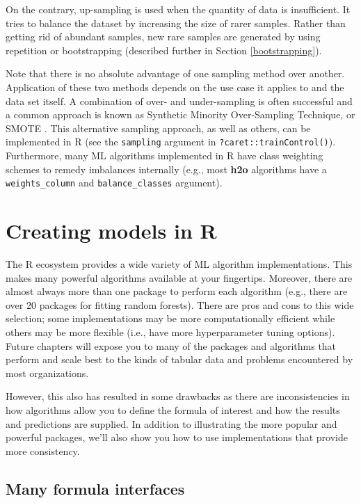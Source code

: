 \documentclass[]{krantz}
\begin{document}
On the contrary, up-sampling is used when the quantity of data is insufficient. It tries to balance the dataset by increasing the size of rarer samples. Rather than getting rid of abundant samples, new rare samples are generated by using repetition or bootstrapping (described further in Section \ref{bootstrapping}).

Note that there is no absolute advantage of one sampling method over another. Application of these two methods depends on the use case it applies to and the data set itself. A combination of over- and under-sampling is often successful and a common approach is known as Synthetic Minority Over-Sampling Technique, or SMOTE \citep{chawla2002smote}. This alternative sampling approach, as well as others, can be implemented in R (see the \texttt{sampling} argument in \texttt{?caret::trainControl()}). Furthermore, many ML algorithms implemented in R have class weighting schemes to remedy imbalances internally (e.g., most \textbf{h2o} algorithms have a \texttt{weights\_column} and \texttt{balance\_classes} argument).

\hypertarget{creating-models-in-r}{%
\section{Creating models in R}\label{creating-models-in-r}}

The R ecosystem provides a wide variety of ML algorithm implementations. This makes many powerful algorithms available at your fingertips. Moreover, there are almost always more than one package to perform each algorithm (e.g., there are over 20 packages for fitting random forests). There are pros and cons to this wide selection; some implementations may be more computationally efficient while others may be more flexible (i.e., have more hyperparameter tuning options). Future chapters will expose you to many of the packages and algorithms that perform and scale best to the kinds of tabular data and problems encountered by most organizations.

However, this also has resulted in some drawbacks as there are inconsistencies in how algorithms allow you to define the formula of interest and how the results and predictions are supplied. In addition to illustrating the more popular and powerful packages, we'll also show you how to use implementations that provide more consistency.

\hypertarget{many-formula-interfaces}{%
\subsection{Many formula interfaces}\label{many-formula-interfaces}}
\end{document}
